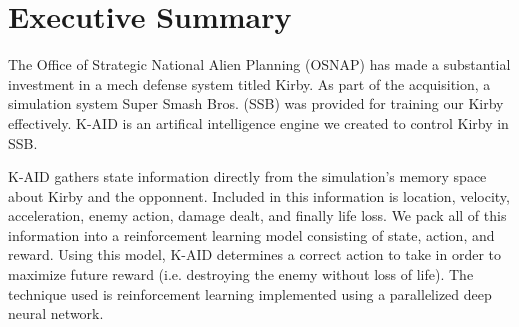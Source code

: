 \chapter*{Executive Summary}

The Office of Strategic National Alien Planning (OSNAP) has made a substantial investment in a mech defense system titled Kirby. 
As part of the acquisition, a simulation system Super Smash Bros. (SSB) was provided for training our Kirby effectively.
K-AID is an artifical intelligence engine we created to control Kirby in SSB.

K-AID gathers state information directly from the simulation's memory space about Kirby and the opponnent.
Included in this information is location, velocity, acceleration, enemy action, damage dealt, and finally life loss.
We pack all of this information into a reinforcement learning model consisting of state, action, and reward.
Using this model, K-AID determines a correct action to take in order to maximize future reward (i.e. destroying the enemy without loss of life).
The technique used is reinforcement learning implemented using a parallelized deep neural network.
